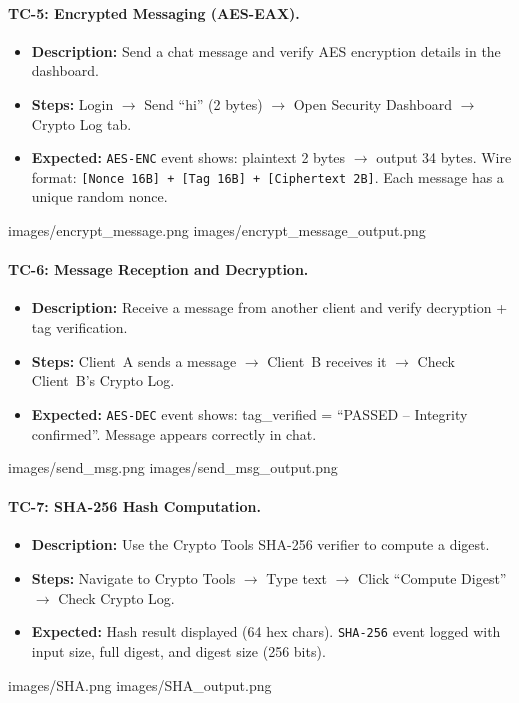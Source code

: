 \documentclass[12pt,a4paper]{article}
\begin{document}
\paragraph{TC-5: Encrypted Messaging (AES-EAX).}
\begin{itemize}
    \item \textbf{Description:} Send a chat message and verify AES encryption details in the dashboard.
    \item \textbf{Steps:} Login $\to$ Send ``hi'' (2 bytes) $\to$ Open Security Dashboard $\to$ Crypto Log tab.
    \item \textbf{Expected:} \texttt{AES-ENC} event shows: plaintext 2 bytes $\to$ output 34 bytes. Wire format: \texttt{[Nonce 16B] + [Tag 16B] + [Ciphertext 2B]}. Each message has a unique random nonce.
\end{itemize}
    {images/encrypt_message.png}%
    {images/encrypt_message_output.png}%

\paragraph{TC-6: Message Reception and Decryption.}
\begin{itemize}
    \item \textbf{Description:} Receive a message from another client and verify decryption + tag verification.
    \item \textbf{Steps:} Client~A sends a message $\to$ Client~B receives it $\to$ Check Client~B's Crypto Log.
    \item \textbf{Expected:} \texttt{AES-DEC} event shows: tag\_verified = ``PASSED -- Integrity confirmed''. Message appears correctly in chat.
\end{itemize}
    {images/send_msg.png}%
    {images/send_msg_output.png}%

\paragraph{TC-7: SHA-256 Hash Computation.}
\begin{itemize}
    \item \textbf{Description:} Use the Crypto Tools SHA-256 verifier to compute a digest.
    \item \textbf{Steps:} Navigate to Crypto Tools $\to$ Type text $\to$ Click ``Compute Digest'' $\to$ Check Crypto Log.
    \item \textbf{Expected:} Hash result displayed (64 hex chars). \texttt{SHA-256} event logged with input size, full digest, and digest size (256 bits).
\end{itemize}
    {images/SHA.png}%
    {images/SHA_output.png}%
\end{document}
